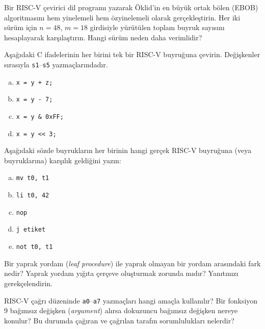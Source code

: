 \begin{alistirma}[\zor]
Bir RISC-V çevirici dil programı yazarak Öklid'in en büyük ortak bölen (EBOB) algoritmasını hem yinelemeli hem özyinelemeli olarak gerçekleştirin. Her iki sürüm için $n = 48$, $m = 18$ girdisiyle yürütülen toplam buyruk sayısını hesaplayarak karşılaştırın. Hangi sürüm neden daha verimlidir?
\end{alistirma}


\begin{alistirma}[\kolay]
Aşağıdaki C ifadelerinin her birini tek bir RISC-V buyruğuna çevirin. Değişkenler sırasıyla \texttt{s1}--\texttt{s5} yazmaçlarındadır.
\begin{enumerate}[(a)]
\item \texttt{x = y + z;}
\item \texttt{x = y - 7;}
\item \texttt{x = y \& 0xFF;}
\item \texttt{x = y << 3;}
\end{enumerate}
\end{alistirma}

\begin{alistirma}[\kolay]
Aşağıdaki sözde buyrukların her birinin hangi gerçek RISC-V buyruğuna (veya buyruklarına) karşılık geldiğini yazın:
\begin{enumerate}[(a)]
\item \texttt{mv t0, t1}
\item \texttt{li t0, 42}
\item \texttt{nop}
\item \texttt{j etiket}
\item \texttt{not t0, t1}
\end{enumerate}
\end{alistirma}

\begin{alistirma}[\kolay]
Bir yaprak yordam (\emph{leaf procedure}) ile yaprak olmayan bir yordam arasındaki fark nedir? Yaprak yordam yığıta çerçeve oluşturmak zorunda mıdır? Yanıtınızı gerekçelendirin.
\end{alistirma}

\begin{alistirma}[\kolay]
RISC-V çağrı düzeninde \texttt{a0}--\texttt{a7} yazmaçları hangi amaçla kullanılır? Bir fonksiyon 9 bağımsız değişken (\emph{argument}) alırsa dokuzuncu bağımsız değişken nereye konulur? Bu durumda çağıran ve çağrılan tarafın sorumlulukları nelerdir?
\end{alistirma}

